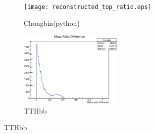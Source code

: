 \documentclass{beamer}
\begin{document}
\begin{frame}
  \begin{figure}[!h]
  \captionsetup[subfigure]{labelformat=empty}
  \begin{subfigure}{.5\textwidth}
  \centering
  \texttt{[image: reconstructed\_top\_ratio.eps]}
  \caption{Chongbin(python)}
  \end{subfigure} \hfill
  \begin{subfigure}{.5\textwidth}
  \centering
  \includegraphics[width=5cm]{hmratio_alljetregion.eps}
  \caption{TTHbb}
  \end{subfigure}
  \end{figure}
\end{frame}
\end{document}
